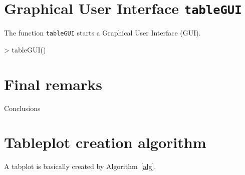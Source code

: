 \documentclass[11pt, fleqn, a4paper]{article}
\begin{document}
\section{Graphical User Interface {\tt tableGUI}}
The function {\tt tableGUI} starts a Graphical User Interface (GUI).
\begin{Schunk}
\begin{Sinput}
> tableGUI()
\end{Sinput}
\end{Schunk}




\section{Final remarks}
Conclusions


%
%

\appendix
\newpage
\section{Tableplot creation algorithm}\label{secalg}
A tabplot is basically created by Algorithm~\ref{alg}.
\end{document}
